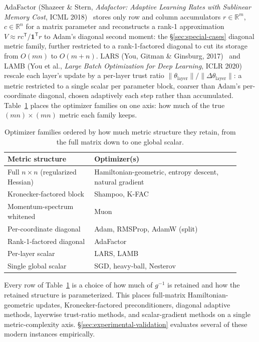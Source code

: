 \documentclass[10pt,twocolumn]{article}
\begin{document}
AdaFactor (Shazeer \& Stern, \emph{Adafactor: Adaptive Learning Rates with
Sublinear Memory Cost}, ICML 2018)~\cite{shazeer2018adafactor} stores only row and
column accumulators $r\in\mathbb R^m$, $c\in\mathbb R^n$ for a matrix
parameter and reconstructs a rank-1 approximation $V\approx rc^{\mathsf
T}/\mathbf 1^{\mathsf T}r$ to Adam's diagonal second moment: the
\S\ref{sec:special-cases} diagonal metric family, further restricted to a
rank-1-factored diagonal to cut its storage from $O(mn)$ to $O(m+n)$. LARS
(You, Gitman \& Ginsburg, 2017)~\cite{you2017lars} and LAMB (You et al.,
\emph{Large Batch Optimization for Deep Learning}, ICLR 2020)~\cite{you2020lamb} rescale each layer's update by a per-layer trust ratio
$\|\theta_{\mathrm{layer}}\|/\|\Delta\theta_{\mathrm{layer}}\|$: a metric
restricted to a single scalar per parameter block, coarser than Adam's
per-coordinate diagonal, chosen adaptively each step rather than accumulated.
Table~\ref{tab:metric-hierarchy} places the optimizer families on one
axis: how much of the true $(mn)\times(mn)$ metric each family keeps.

\begin{table}[t]
\centering
\caption{Optimizer families ordered by how much metric structure they retain,
from the full matrix down to one global scalar.}
\label{tab:metric-hierarchy}
\begin{tabular}{@{}p{0.34\linewidth}p{0.58\linewidth}@{}}
\toprule
Metric structure & Optimizer(s) \\
\midrule
Full $n\times n$ (regularized Hessian) & Hamiltonian-geometric, entropy descent, natural gradient \\
Kronecker-factored block & Shampoo, K-FAC \\
Momentum-spectrum whitened & Muon \\
Per-coordinate diagonal & Adam, RMSProp, AdamW (split) \\
Rank-1-factored diagonal & AdaFactor \\
Per-layer scalar & LARS, LAMB \\
Single global scalar & SGD, heavy-ball, Nesterov \\
\bottomrule
\end{tabular}
\end{table}

Every row of Table~\ref{tab:metric-hierarchy} is a choice of how much of
$g^{-1}$ is retained and how the retained structure is parameterized. This
places full-matrix Hamiltonian-geometric updates, Kronecker-factored
preconditioners, diagonal adaptive methods, layerwise trust-ratio methods,
and scalar-gradient methods on a single metric-complexity axis.
\S\ref{sec:experimental-validation} evaluates several of these modern
instances empirically.
\end{document}
